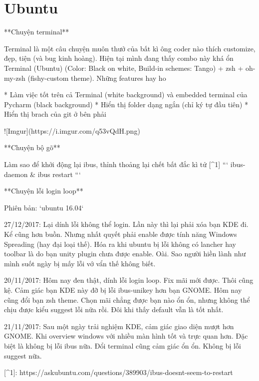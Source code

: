 \chapter{Ubuntu}

**Chuyện terminal**

Terminal là một câu chuyện muôn thưở của bất kì ông coder nào thích customize, đẹp, tiện (và bug kinh hoàng). Hiện tại mình đang thấy combo này khá ổn Terminal (Ubuntu) (Color: Black on white, Build-in schemes: Tango) + zsh + oh-my-zsh (fishy-custom theme). Những features hay ho

* Làm việc tốt trên cả Terminal (white background) và embedded terminal của Pycharm (black background)
* Hiển thị folder dạng ngắn (chỉ ký tự đầu tiên)
* Hiển thị brach của git ở bên phải

![Imgur](https://i.imgur.com/q53vQdH.png)

**Chuyện bộ gõ**

Làm sao để khởi động lại ibus, thỉnh thoảng lại chết bất đắc kì tử [^1]
```
ibus-daemon &
ibus restart
```

**Chuyện lỗi login loop**

Phiên bản: `ubuntu 16.04`

27/12/2017: Lại dính lỗi không thể login. Lần này thì lại phải xóa bạn KDE đi. Kể cũng hơn buồn. Nhưng nhất quyết phải enable được tính năng Windows Spreading (hay đại loại thế). Hóa ra khi ubuntu bị lỗi không có lancher hay toolbar là do bạn unity plugin chưa được enable. Oài. Sao người hiền lành như mình suốt ngày bị mấy lỗi vớ vẩn thế không biết.

20/11/2017: Hôm nay đen thật, dính lỗi login loop. Fix mãi mới được. Thôi cũng kệ. Cảm giác bạn KDE này đỡ bị lỗi ibus-unikey hơn bạn GNOME. Hôm nay cũng đổi bạn zsh theme. Chọn mãi chẳng được bạn nào ổn ổn, nhưng không thể chịu được kiểu suggest lỗi nữa rồi. Đôi khi thấy default vẫn là tốt nhất.

21/11/2017: Sau một ngày trải nghiệm KDE, cảm giác giao diện mượt hơn GNOME. Khi overview windows với nhiều màn hình tốt và trực quan hơn. Đặc biệt là không bị lỗi ibus nữa. Đổi terminal cũng cảm giác ổn ổn. Không bị lỗi suggest nữa.

[^1]: https://askubuntu.com/questions/389903/ibus-doesnt-seem-to-restart